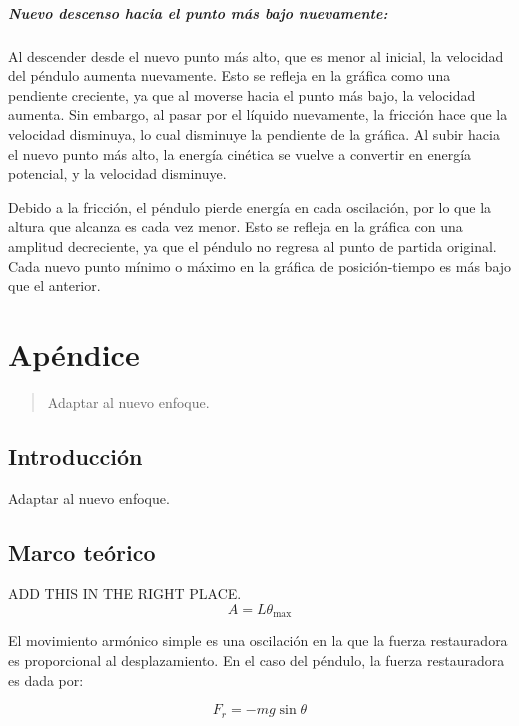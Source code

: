 \documentclass[twocolumn]{report}
\numberwithin{table}{section}
\begin{document}
\paragraph{Nuevo descenso hacia el punto más bajo nuevamente:} Al
descender desde el nuevo punto más alto, que es menor al inicial, la
velocidad del péndulo aumenta nuevamente. Esto se refleja en la
gráfica como una pendiente creciente, ya que al moverse hacia el
punto más bajo, la velocidad aumenta. Sin embargo, al pasar por el
líquido nuevamente, la fricción hace que la velocidad disminuya, lo
cual disminuye la pendiente de la gráfica. Al subir hacia el nuevo
punto más alto, la energía cinética se vuelve a convertir en energía
potencial, y la velocidad disminuye.

Debido a la fricción, el péndulo pierde energía en cada oscilación,
por lo que la altura que alcanza es cada vez menor. Esto se refleja
en la gráfica con una amplitud decreciente, ya que el péndulo no
regresa al punto de partida original. Cada nuevo punto mínimo o
máximo en la gráfica de posición-tiempo es más bajo que el anterior.

\chapter{Apéndice}

\begin{abstract}
  {\color{red} Adaptar al nuevo enfoque.}
\end{abstract}

\section{Introducción}

{\color{red}Adaptar al nuevo enfoque.}

\section{Marco teórico}

{\color{red}ADD THIS IN THE RIGHT PLACE.}
\begin{equation}
  A = L\theta_{\max}
\end{equation}

El movimiento armónico simple es una oscilación en la que la fuerza restauradora
es proporcional al desplazamiento. En el caso del péndulo, la fuerza
restauradora es dada por:

\begin{equation}\label{eq:restauradora}
  F_{r} = -mg\sin{\theta}
\end{equation}
\end{document}
